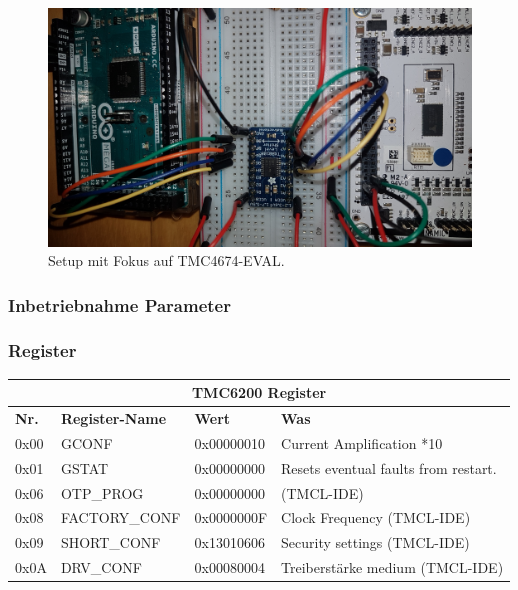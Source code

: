 \begin{figure}[H]
	\centering
	\includegraphics[angle=180,width=\textwidth]{graphics/1_EVAL}
	\caption{Setup mit Fokus auf TMC4674-EVAL.}
	\label{fig:1_EVAL}
\end{figure}

\subsubsection{Inbetriebnahme Parameter}\label{Appendix:TMC6200_SPI}


\subsubsection{Register}\label{Appendix:TMC6200_Register}

\begin{table}[H]
\begin{tabular}{|l|l|l|l|}
\hline
\multicolumn{4}{|c|}{\textbf{TMC6200 Register}}          \\ \hline
\textbf{Nr.} & \textbf{Register-Name} & \textbf{Wert}       & \textbf{Was} \\ \hline
0x00         & GCONF         & 0x00000010 & Current Amplification *10    \\ \hline
0x01         & GSTAT         & 0x00000000 & Resets eventual faults from restart.    \\ \hline
0x06         & OTP\_PROG     & 0x00000000 & (TMCL-IDE)    \\ \hline
0x08         & FACTORY\_CONF & 0x0000000F & Clock Frequency (TMCL-IDE)    \\ \hline
0x09         & SHORT\_CONF   & 0x13010606 & Security settings (TMCL-IDE)    \\ \hline
0x0A         & DRV\_CONF     & 0x00080004 & Treiberstärke medium (TMCL-IDE)    \\ \hline
\end{tabular}
\end{table}

